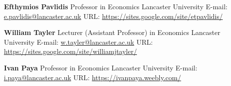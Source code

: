 \documentclass[10pt,]{article}
\begin{document}
              \textbf{Efthymios Pavlidis} \newline  Professor in
              Economics \newline  Lancaster University \newline  E-mail:
              \url{e.pavlidis@lancaster.ac.uk} \newline  URL:
              \url{https://sites.google.com/site/etpavlidis/}

              \textbf{William Tayler} \newline  Lecturer (Assistant
              Professor) in Economics \newline  Lancaster University
              \newline  E-mail: \url{w.tayler@lancaster.ac.uk} \newline 
              URL: \url{https://sites.google.com/site/williamjtayler/}

              \textbf{Ivan Paya} \newline  Professor in Economics
              \newline  Lancaster University \newline  E-mail:
              \url{i.paya@lancaster.ac.uk} \newline  URL:
              \url{https://ivanpaya.weebly.com/}
              
                
                                                                
\end{document}
